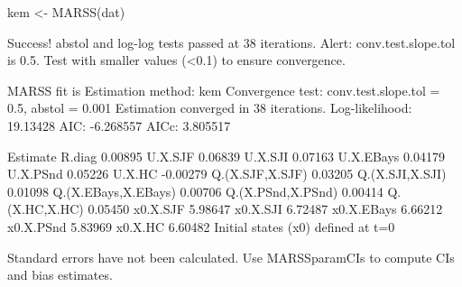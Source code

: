 \begin{Schunk}
\begin{Sinput}
 kem <- MARSS(dat)
\end{Sinput}
\begin{Soutput}
Success! abstol and log-log tests passed at 38 iterations.
Alert: conv.test.slope.tol is 0.5.
Test with smaller values (<0.1) to ensure convergence.

MARSS fit is
Estimation method: kem 
Convergence test: conv.test.slope.tol = 0.5, abstol = 0.001
Estimation converged in 38 iterations. 
Log-likelihood: 19.13428 
AIC: -6.268557   AICc: 3.805517   
 
                    Estimate
R.diag               0.00895
U.X.SJF              0.06839
U.X.SJI              0.07163
U.X.EBays            0.04179
U.X.PSnd             0.05226
U.X.HC              -0.00279
Q.(X.SJF,X.SJF)      0.03205
Q.(X.SJI,X.SJI)      0.01098
Q.(X.EBays,X.EBays)  0.00706
Q.(X.PSnd,X.PSnd)    0.00414
Q.(X.HC,X.HC)        0.05450
x0.X.SJF             5.98647
x0.X.SJI             6.72487
x0.X.EBays           6.66212
x0.X.PSnd            5.83969
x0.X.HC              6.60482
Initial states (x0) defined at t=0

Standard errors have not been calculated. 
Use MARSSparamCIs to compute CIs and bias estimates.
\end{Soutput}
\end{Schunk}
